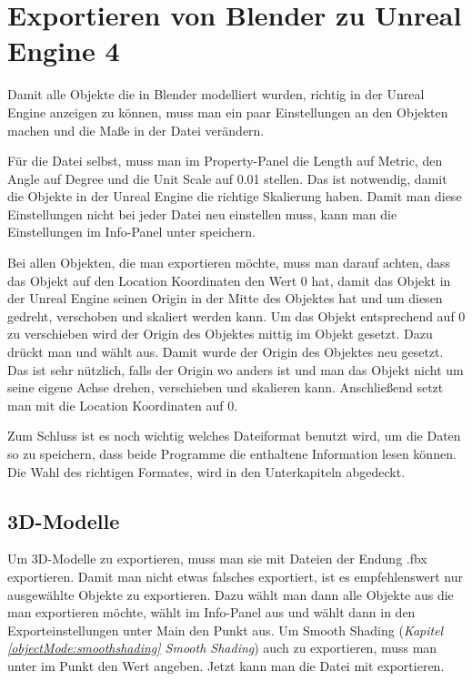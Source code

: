 \section{Exportieren von Blender zu Unreal Engine 4}
\label{Exportieren_von_Blender_zu_Unreal_Engine_4:ref1}
Damit alle Objekte die in Blender modelliert wurden, richtig in der Unreal Engine anzeigen zu können, muss man ein paar
Einstellungen an den Objekten machen und die Maße in der Datei verändern.

Für die Datei selbst, muss man im Property-Panel die Length auf Metric, den Angle auf Degree und die Unit Scale auf 0.01 stellen.
Das ist notwendig, damit die Objekte in der Unreal Engine die richtige Skalierung haben. Damit man diese Einstellungen nicht bei
jeder Datei neu einstellen muss, kann man die Einstellungen im Info-Panel unter  speichern.

Bei allen Objekten, die man exportieren möchte, muss man darauf achten, dass das Objekt auf den Location Koordinaten
den Wert 0 hat, damit das Objekt in der Unreal Engine seinen Origin in der Mitte des Objektes hat und um diesen gedreht, verschoben und skaliert werden kann.
Um das Objekt entsprechend auf 0 zu verschieben wird der Origin des Objektes mittig im Objekt gesetzt. Dazu drückt man  und
wählt  aus. Damit wurde der Origin des Objektes neu gesetzt. Das ist sehr nützlich, falls der Origin wo anders ist und man das
Objekt nicht um seine eigene Achse drehen, verschieben und skalieren kann. Anschließend setzt man mit  die Location Koordinaten auf 0.

Zum Schluss ist es noch wichtig welches Dateiformat benutzt wird, um die Daten so zu speichern, dass beide Programme die enthaltene
Information lesen können. Die Wahl des richtigen Formates, wird in den Unterkapiteln abgedeckt.

\subsection{3D-Modelle}
Um 3D-Modelle zu exportieren, muss man sie mit Dateien der Endung .fbx exportieren. Damit man nicht etwas falsches exportiert, ist es empfehlenswert
nur ausgewählte Objekte zu exportieren. Dazu wählt man dann alle Objekte aus die man exportieren möchte, wählt im Info-Panel  aus und wählt dann in den Exporteinstellungen unter Main den Punkt  aus. Um Smooth Shading (\textit{Kapitel \ref{objectMode:smoothshading} \dq Smooth Shading\dq})
auch zu exportieren, muss man unter  im Punkt  den Wert  angeben. Jetzt kann man die Datei mit  exportieren.

